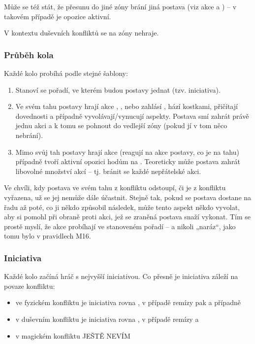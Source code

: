 \documentclass[../main.tex]{subfiles}
\begin{document}
Může se též stát, že přesunu do jiné zóny brání jiná postava (viz akce  a
) – v takovém případě je opozice aktivní.

V kontextu duševních konfliktů se na zóny nehraje.

\subsubsection{Průběh kola}
\label{sec:prubehkola}

Každé kolo probíhá podle stejné šablony:

\begin{enumerate}
  \item Stanoví se pořadí, ve kterém budou postavy jednat (tzv. iniciativa).
  \item Ve svém tahu postavy hrají akce , ,
     nebo zahlásí , hází kostkami, přičítají dovednosti
    a případně vyvolávají/vynucují aspekty. Postava smí zahrát právě jednu akci a k tomu
    se pohnout do vedlejší zóny (pokud jí v tom něco nebrání).
  \item Mimo svůj tah postavy hrají akce  (reagují na akce postavy, co je na
    tahu) případně tvoří aktivní opozici hodům na . Teoreticky může
    postava zahrát libovolné množství akcí  – tj. bránit se každé nepřátelské akci.
\end{enumerate}

Ve chvíli, kdy postava ve svém tahu z konfliktu odstoupí, či je z konfliktu vyřazena, už
se jej nemůže dále účastnit. Stejně tak, pokud se postava dostane na řadu až poté, co ji
někdo způsobil následek, může tento aspekt někdo vyvolat, aby si pomohl při obraně proti
akci, jež se zraněná postava snaží vykonat. Tím se prostě myslí, že akce probíhají ve
stanoveném pořadí – a nikoli „naráz“, jako tomu bylo v pravidlech M16.

\subsubsection{Iniciativa}
\label{sec:iniciativa}

Každé kolo začíná hráč s nejvyšší iniciativou. Co přesně je iniciativa záleží na povaze konfliktu:


\begin{pravidlo}
  \begin{itemize}
    \item ve fyzickém konfliktu je iniciativa rovna , v případě remízy pak
       a případně 
    \item v duševním konfliktu je iniciativa rovna , v případě remízy
       a 
    \item v magickém konfliktu JEŠTĚ NEVÍM
  \end{itemize}
\end{pravidlo}
\end{document}
